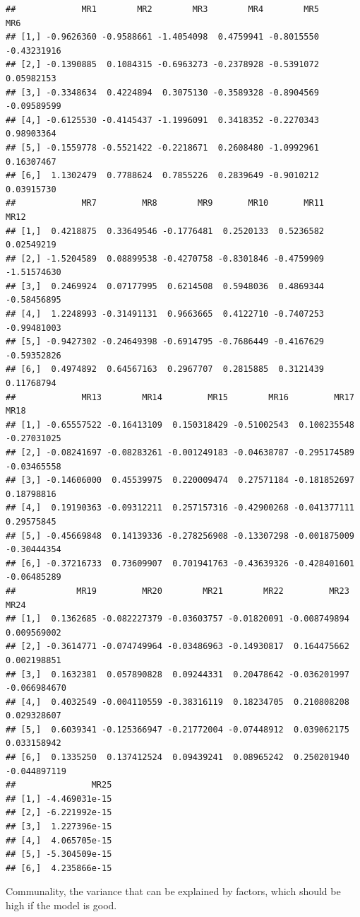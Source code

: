 \documentclass[
]{ctexart}
\begin{document}
\begin{verbatim}
##             MR1        MR2        MR3        MR4        MR5         MR6
## [1,] -0.9626360 -0.9588661 -1.4054098  0.4759941 -0.8015550 -0.43231916
## [2,] -0.1390885  0.1084315 -0.6963273 -0.2378928 -0.5391072  0.05982153
## [3,] -0.3348634  0.4224894  0.3075130 -0.3589328 -0.8904569 -0.09589599
## [4,] -0.6125530 -0.4145437 -1.1996091  0.3418352 -0.2270343  0.98903364
## [5,] -0.1559778 -0.5521422 -0.2218671  0.2608480 -1.0992961  0.16307467
## [6,]  1.1302479  0.7788624  0.7855226  0.2839649 -0.9010212  0.03915730
##             MR7         MR8        MR9       MR10       MR11        MR12
## [1,]  0.4218875  0.33649546 -0.1776481  0.2520133  0.5236582  0.02549219
## [2,] -1.5204589  0.08899538 -0.4270758 -0.8301846 -0.4759909 -1.51574630
## [3,]  0.2469924  0.07177995  0.6214508  0.5948036  0.4869344 -0.58456895
## [4,]  1.2248993 -0.31491131  0.9663665  0.4122710 -0.7407253 -0.99481003
## [5,] -0.9427302 -0.24649398 -0.6914795 -0.7686449 -0.4167629 -0.59352826
## [6,]  0.4974892  0.64567163  0.2967707  0.2815885  0.3121439  0.11768794
##             MR13        MR14         MR15        MR16         MR17        MR18
## [1,] -0.65557522 -0.16413109  0.150318429 -0.51002543  0.100235548 -0.27031025
## [2,] -0.08241697 -0.08283261 -0.001249183 -0.04638787 -0.295174589 -0.03465558
## [3,] -0.14606000  0.45539975  0.220009474  0.27571184 -0.181852697  0.18798816
## [4,]  0.19190363 -0.09312211  0.257157316 -0.42900268 -0.041377111  0.29575845
## [5,] -0.45669848  0.14139336 -0.278256908 -0.13307298 -0.001875009 -0.30444354
## [6,] -0.37216733  0.73609907  0.701941763 -0.43639326 -0.428401601 -0.06485289
##            MR19         MR20        MR21        MR22         MR23         MR24
## [1,]  0.1362685 -0.082227379 -0.03603757 -0.01820091 -0.008749894  0.009569002
## [2,] -0.3614771 -0.074749964 -0.03486963 -0.14930817  0.164475662  0.002198851
## [3,]  0.1632381  0.057890828  0.09244331  0.20478642 -0.036201997 -0.066984670
## [4,]  0.4032549 -0.004110559 -0.38316119  0.18234705  0.210808208  0.029328607
## [5,]  0.6039341 -0.125366947 -0.21772004 -0.07448912  0.039062175  0.033158942
## [6,]  0.1335250  0.137412524  0.09439241  0.08965242  0.250201940 -0.044897119
##               MR25
## [1,] -4.469031e-15
## [2,] -6.221992e-15
## [3,]  1.227396e-15
## [4,]  4.065705e-15
## [5,] -5.304509e-15
## [6,]  4.235866e-15
\end{verbatim}

Communality, the variance that can be explained by factors, which should
be high if the model is good.
\end{document}
